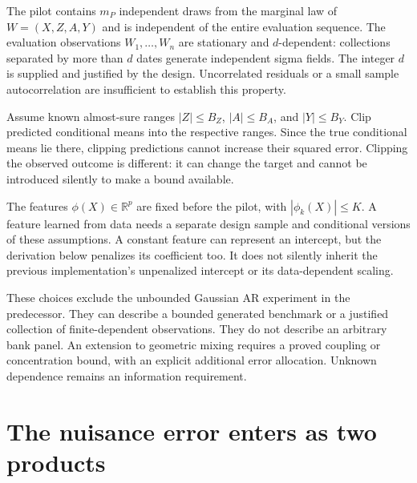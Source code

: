 The pilot contains $m_P$ independent draws from the marginal law of
$W=(X,Z,A,Y)$ and is independent of the entire evaluation sequence. The
evaluation observations $W_1,\ldots,W_n$ are stationary and $d$-dependent:
collections separated by more than $d$ dates generate independent sigma fields.
The integer $d$ is supplied and justified by the design. Uncorrelated residuals
or a small sample autocorrelation are insufficient to establish this property.

Assume known almost-sure ranges $|Z|\le B_Z$, $|A|\le B_A$, and $|Y|\le B_Y$.
Clip predicted conditional means into the respective ranges. Since the true
conditional means lie there, clipping predictions cannot increase their squared
error. Clipping the observed outcome is different: it can change the target
and cannot be introduced silently to make a bound available.

The features $\phi(X)\in\mathbb R^p$ are fixed before the pilot, with
$|\phi_k(X)|\le K$. A feature learned from data needs a separate design sample
and conditional versions of these assumptions. A constant feature can represent
an intercept, but the derivation below penalizes its coefficient too. It does
not silently inherit the previous implementation's unpenalized intercept or
its data-dependent scaling.

These choices exclude the unbounded Gaussian AR experiment in the predecessor.
They can describe a bounded generated benchmark or a justified collection of
finite-dependent observations. They do not describe an arbitrary bank panel.
An extension to geometric mixing requires a proved coupling or concentration
bound, with an explicit additional error allocation. Unknown dependence remains
an information requirement.

\section{The nuisance error enters as two products}

